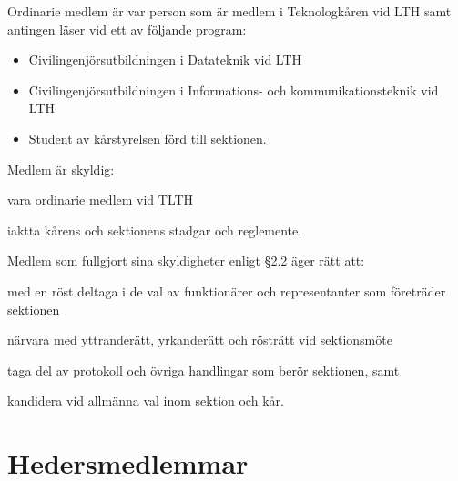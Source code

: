\documentclass[stadgar]{dsekprotokoll}
\begin{document}
\begin{stadgeavsnitt}


 Ordinarie medlem är var person som är medlem i Teknologkåren vid LTH samt antingen läser vid
ett av följande program:
\begin{itemize}
\item Civilingenjörsutbildningen i Datateknik vid LTH
\item Civilingenjörsutbildningen i Informations- och kommunikationsteknik vid LTH
\item Student av kårstyrelsen förd till sektionen.
\end{itemize}


Medlem är skyldig:
\begin{attlista}
\item vara ordinarie medlem vid TLTH
\item iaktta kårens och sektionens stadgar och reglemente.
\end{attlista}


Medlem som fullgjort sina skyldigheter enligt \S2.2 äger rätt att:
\begin{attlista}
\item med en röst deltaga i de val av funktionärer och representanter som
  företräder sektionen
\item närvara med yttranderätt, yrkanderätt och rösträtt vid sektionsmöte
\item taga del av protokoll och övriga handlingar som berör sektionen, samt
\item kandidera vid allmänna val inom sektion och kår.
\end{attlista}

\end{stadgeavsnitt}

\section{Hedersmedlemmar}
\end{document}
